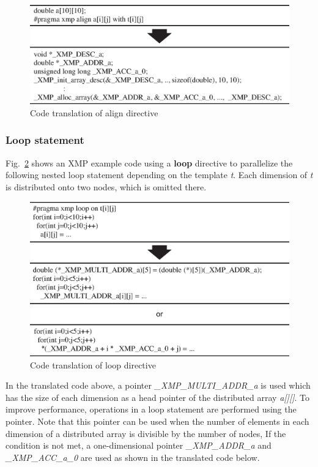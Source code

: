 \documentclass[graybox]{svmult}
\begin{document}
\begin{figure}[h]
\sidecaption
\includegraphics[scale=.75]{img/translation-align.eps}
\caption{Code translation of align directive} \label{fig:translation-align}
\end{figure}
\subsubsection{Loop statement}
Fig.~\ref{fig:translation-loop} shows an XMP example code using a {\bf loop} directive to parallelize the following nested loop statement depending on the template {\it t}. 
Each dimension of {\it t} is distributed onto two nodes, which is omitted there.

\begin{figure}[h]
\sidecaption
\includegraphics[scale=.75]{img/translation-loop.eps}
\caption{Code translation of loop directive} \label{fig:translation-loop}
\end{figure}

In the translated code above,
a pointer {\it \_XMP\_MULTI\_ADDR\_a} is used which has the size of each dimension as a head pointer of the distributed array {\it a[][]}.
To improve performance, operations in a loop statement are performed using the pointer\cite{ixpug}.
Note that this pointer can be used when the number of elements in each dimension of a distributed array is divisible by the number of nodes,
If the condition is not met, a one-dimensional pointer  {\it \_XMP\_ADDR\_a}  and  {\it \_XMP\_ACC\_a\_0} are used as shown in the translated code below.
\end{document}
